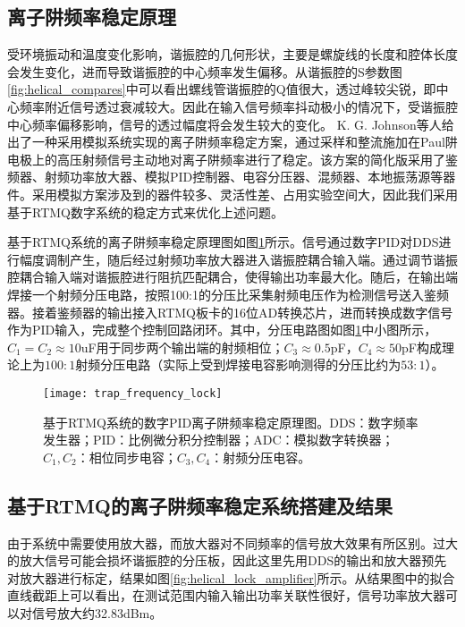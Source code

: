 \subsection[离子阱频率稳定原理]{离子阱频率稳定原理}
受环境振动和温度变化影响，谐振腔的几何形状，主要是螺旋线的长度和腔体长度会发生变化，进而导致谐振腔的中心频率发生偏移。从谐振腔的S参数图\ref{fig:helical_compares}中可以看出螺线管谐振腔的Q值很大，透过峰较尖锐，即中心频率附近信号透过衰减较大。因此在输入信号频率抖动极小的情况下，受谐振腔中心频率偏移影响，信号的透过幅度将会发生较大的变化。
K. G. Johnson等人\cite[]{Johnson_Wong_Campos_Restelli_Landsman_Neyenhuis_Mizrahi_Monroe_2016}给出了一种采用模拟系统实现的离子阱频率稳定方案，通过采样和整流施加在Paul阱电极上的高压射频信号主动地对离子阱频率进行了稳定。该方案的简化版采用了鉴频器、射频功率放大器、模拟PID控制器、电容分压器、混频器、本地振荡源等器件。采用模拟方案涉及到的器件较多、灵活性差、占用实验空间大，因此我们采用基于RTMQ数字系统的稳定方式来优化上述问题。

基于RTMQ系统的离子阱频率稳定原理图如图\ref{fig:trap_frequency_lock}所示。信号通过数字PID对DDS进行幅度调制产生，随后经过射频功率放大器进入谐振腔耦合输入端。通过调节谐振腔耦合输入端对谐振腔进行阻抗匹配耦合，使得输出功率最大化。随后，在输出端焊接一个射频分压电路，按照100:1的分压比采集射频电压作为检测信号送入鉴频器。接着鉴频器的输出接入RTMQ板卡的16位AD转换芯片，进而转换成数字信号作为PID输入，完成整个控制回路闭环。其中，分压电路图如图\ref{fig:trap_frequency_lock}中小图所示，$C_1=C_2\approx10$uF用于同步两个输出端的射频相位；$C_3\approx0.5$pF，$C_4\approx50$pF构成理论上为$100:1$射频分压电路（实际上受到焊接电容影响测得的分压比约为$53:1$）。

\begin{figure}
    \centering
    \caption[基于RTMQ系统的数字PID离子阱频率稳定原理图]{基于RTMQ系统的数字PID离子阱频率稳定原理图。DDS：数字频率发生器；PID：比例微分积分控制器；ADC：模拟数字转换器；$C_1,C_2$：相位同步电容；$C_3,C_4$：射频分压电容。\label{fig:trap_frequency_lock}}
    \texttt{[image: trap\_frequency\_lock]}
\end{figure}


\subsection[基于RTMQ的离子阱频率稳定系统搭建及结果]{基于RTMQ的离子阱频率稳定系统搭建及结果}

由于系统中需要使用放大器，而放大器对不同频率的信号放大效果有所区别。过大的放大信号可能会损坏谐振腔的分压板，因此这里先用DDS的输出和放大器预先对放大器进行标定，结果如图\ref{fig:helical_lock_amplifier}所示。从结果图中的拟合直线截距上可以看出，在测试范围内输入输出功率关联性很好，信号功率放大器可以对信号放大约32.83dBm。

